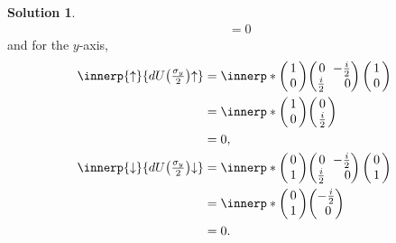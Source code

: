 \documentclass[11pt, a4paper]{report}
\theoremstyle{definition}
\newtheorem{solution}{Solution}[part]
\newenvironment{sol}{\begin{solution}}{\end{solution}\pagebreak[3]}
\newcommand*{\m}{\ensuremath\:\, \mathllap{-}}
\begin{document}
\begin{sol}
\begin{align*}
        &= 0
\end{align*}
and for the $y$-axis,
\begin{align*}
    \innerp{\uparrow}{dU\bigl(\tfrac{\sigma_y}{2}\bigr) {\uparrow}}
        &= \innerp*{\begin{pmatrix}
                \,1\, \\ 0
            \end{pmatrix}}
            {\begin{pmatrix*}[r]
                0           & \m\frac{i}{2} \\
                \frac{i}{2} &  0
            \end{pmatrix*}
            \begin{pmatrix}
                \,1\, \\ 0
            \end{pmatrix}} \\
        &= \innerp*{\begin{pmatrix}
                \,1\, \\ 0
            \end{pmatrix}}
            {\begin{pmatrix}
                \,0\, \\ \tfrac{i}{2}
            \end{pmatrix}} \\
        &= 0, \\
    \innerp{\downarrow}{dU\bigl(\tfrac{\sigma_y}{2}\bigr) {\downarrow}}
        &= \innerp*{\begin{pmatrix}
                \,0\, \\ 1
            \end{pmatrix}}
            {\begin{pmatrix*}[r]
                0           & \m\frac{i}{2} \\
                \frac{i}{2} & 0
            \end{pmatrix*}
            \begin{pmatrix}
                \,0\, \\ 1
            \end{pmatrix}} \\
        &= \innerp*{\begin{pmatrix}
                \,0\, \\ 1
            \end{pmatrix}}
            {\begin{pmatrix}
                -\tfrac{i}{2} \\ \,\, 0
            \end{pmatrix}} \\
        &= 0.
\end{align*}

\end{sol}
\end{document}
